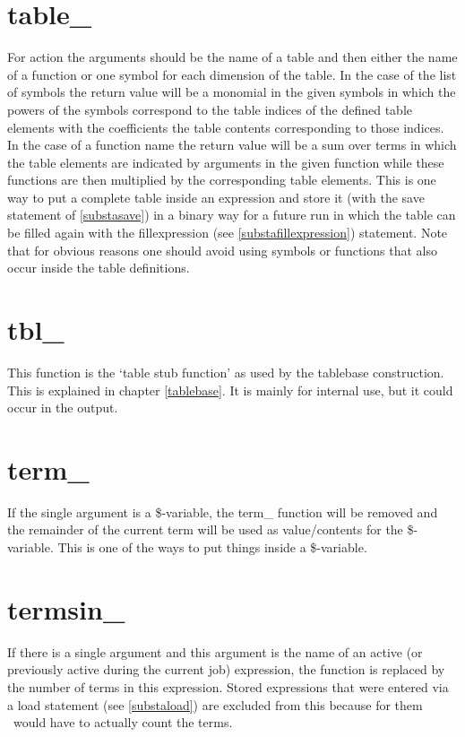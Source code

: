 \section{table\_}
\label{funtable}
\noindent For action the arguments should be the name of a table and then 
either the name of a function or one symbol for each dimension of the 
table. In the case of the list of symbols the return value will be a 
monomial in the given symbols in which the powers of the symbols correspond 
to the table indices of the defined table elements with the coefficients 
the table contents corresponding to those indices. In the case of a 
function name the return value will be a sum over terms in which the table 
elements are indicated by arguments in the given function while these 
functions are then multiplied by the corresponding table elements. This is 
one way to put a complete table inside an expression and store it (with the 
save statement of \ref{substasave}) in a binary way for a future run in 
which the table can be filled again with the 
fillexpression (see \ref{substafillexpression}) 
statement. Note that for obvious reasons one should avoid using symbols or 
functions that also occur inside the table definitions.

\section{tbl\_}
\label{funtbl}
\noindent This function is the `table stub function' as used by the 
tablebase construction. This is explained in chapter 
\ref{tablebase}. It is mainly for internal use, but it could occur in the 
output.

\section{term\_}
\label{funterm}
\noindent If the single argument is a \$-variable, the 
term\_ function will be removed and the remainder of the current term will 
be used as value/contents for the \$-variable. This is one of the ways to 
put things inside a \$-variable.

\section{termsin\_}
\label{funtermsin}
\noindent If there is a single argument and this argument is the name of an 
active (or previously active during the current job) expression, the 
function is replaced by the number of terms in this 
expression. Stored expressions that were entered via a load statement (see 
\ref{substaload}) are excluded from this because for them \FORM\ would have 
to actually count the terms.
 
